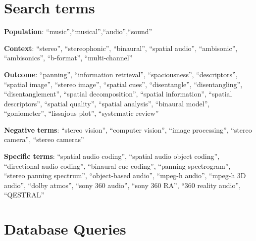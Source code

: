 \documentclass[referee,pdflatex,sn-mathphys-num]{sn-jnl}%
\begin{document}
\begin{appendices}

\section{Search terms}
\label{ap:search_terms}
\noindent \textbf{Population}: \enquote{music},\enquote{musical},\enquote{audio},\enquote{sound}

\noindent \textbf{Context}: \enquote{stereo}, \enquote{stereophonic}, \enquote{binaural}, \enquote{spatial audio}, \enquote{ambisonic}, \enquote{ambisonics}, \enquote{b-format}, \enquote{multi-channel}

\noindent \textbf{Outcome}: \enquote{panning}, \enquote{information retrieval}, \enquote{spaciousness}, \enquote{descriptors}, \enquote{spatial image}, \enquote{stereo image}, \enquote{spatial cues}, \enquote{disentangle}, \enquote{disentangling}, \enquote{disentanglement}, \enquote{spatial decomposition}, \enquote{spatial information}, \enquote{spatial descriptors}, \enquote{spatial quality}, \enquote{spatial analysis}, \enquote{binaural model}, \enquote{goniometer}, \enquote{lissajous plot}, \enquote{systematic review}

\noindent \textbf{Negative terms}: \enquote{stereo vision}, \enquote{computer vision}, \enquote{image processing}, \enquote{stereo camera}, \enquote{stereo cameras}

\noindent \textbf{Specific terms}: \enquote{spatial audio coding}, \enquote{spatial audio object coding}, \enquote{directional audio coding}, \enquote{binaural cue coding}, \enquote{panning spectrogram}, \enquote{stereo panning spectrum}, \enquote{object-based audio}, \enquote{mpeg-h audio}, \enquote{mpeg-h 3D audio}, \enquote{dolby atmos}, \enquote{sony 360 audio}, \enquote{sony 360 RA}, \enquote{360 reality audio}, \enquote{QESTRAL}

\section{Database Queries}
\label{app:database_queries}


\end{appendices}
\end{document}
